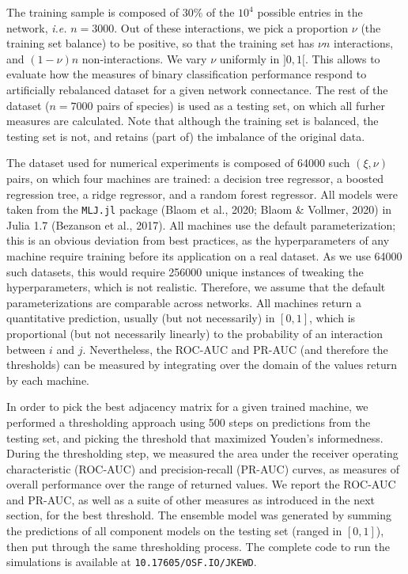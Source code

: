 \documentclass[11pt]{article}
\begin{document}
The training sample is composed of 30\% of the \(10^4\) possible entries
in the network, \emph{i.e.} \(n=3000\). Out of these interactions, we
pick a proportion \(\nu\) (the training set balance) to be positive, so
that the training set has \(\nu n\) interactions, and \((1-\nu) n\)
non-interactions. We vary \(\nu\) uniformly in \(]0,1[\). This allows to
evaluate how the measures of binary classification performance respond
to artificially rebalanced dataset for a given network connectance. The
rest of the dataset (\(n=7000\) pairs of species) is used as a testing
set, on which all furher measures are calculated. Note that although the
training set is balanced, the testing set is not, and retains (part of)
the imbalance of the original data.

The dataset used for numerical experiments is composed of 64000 such
\((\xi, \nu)\) pairs, on which four machines are trained: a decision
tree regressor, a boosted regression tree, a ridge regressor, and a
random forest regressor. All models were taken from the \texttt{MLJ.jl}
package (Blaom et al., 2020; Blaom \& Vollmer, 2020) in Julia 1.7
(Bezanson et al., 2017). All machines use the default parameterization;
this is an obvious deviation from best practices, as the hyperparameters
of any machine require training before its application on a real
dataset. As we use 64000 such datasets, this would require 256000 unique
instances of tweaking the hyperparameters, which is not realistic.
Therefore, we assume that the default parameterizations are comparable
across networks. All machines return a quantitative prediction, usually
(but not necessarily) in \([0,1]\), which is proportional (but not
necessarily linearly) to the probability of an interaction between \(i\)
and \(j\). Nevertheless, the ROC-AUC and PR-AUC (and therefore the
thresholds) can be measured by integrating over the domain of the values
return by each machine.

In order to pick the best adjacency matrix for a given trained machine,
we performed a thresholding approach using 500 steps on predictions from
the testing set, and picking the threshold that maximized Youden's
informedness. During the thresholding step, we measured the area under
the receiver operating characteristic (ROC-AUC) and precision-recall
(PR-AUC) curves, as measures of overall performance over the range of
returned values. We report the ROC-AUC and PR-AUC, as well as a suite of
other measures as introduced in the next section, for the best
threshold. The ensemble model was generated by summing the predictions
of all component models on the testing set (ranged in \([0,1]\)), then
put through the same thresholding process. The complete code to run the
simulations is available at \texttt{10.17605/OSF.IO/JKEWD}.
\end{document}
